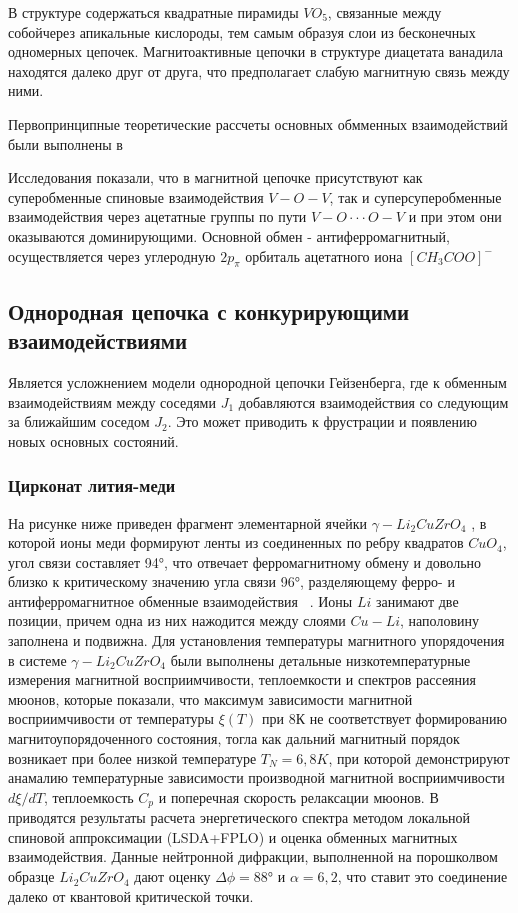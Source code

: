 \documentclass[11pt]{article}
\begin{document}
В структуре содержаться квадратные пирамиды $VO_5$, связанные между собойчерез апикальные кислороды, тем самым образуя слои из бесконечных одномерных цепочек. Магнитоактивные цепочки в структуре диацетата ванадила находятся далеко друг от друга, что предполагает слабую магнитную связь между ними.

Первопринципные теоретические рассчеты основных обмменных взаимодействий были выполнены в ~\cite{koo2010}

Исследования показали, что в магнитной цепочке присутствуют как суперобменные спиновые взаимодействия $V-O-V$, так и суперсуперобменные взаимодействия через ацетатные группы по пути $V-O \cdot \cdot \cdot O-V$ и при этом они оказываются доминирующими.
Основной обмен - антиферромагнитный, осуществляется через углеродную $2p_{\pi}$ орбиталь ацетатного иона $[CH_3COO]^{-}$

\subsection{Однородная цепочка с конкурирующими взаимодействиями}
Является усложнением модели однородной цепочки Гейзенберга, где к обменным взаимодействиям между соседями $J_1$ добавляются взаимодействия со следующим за ближайшим соседом $J_2$. Это может приводить к фрустрации и появлению новых основных состояний.

\subsubsection{Цирконат лития-меди}
На рисунке ниже приведен фрагмент элементарной ячейки $\gamma - Li_2CuZrO_4$ , в которой ионы меди формируют ленты из соединенных по ребру квадратов $CuO_4$, угол связи составляет 94°, что 
отвечает ферромагнитному обмену и довольно близко к критическому значению угла связи 96°, разделяющему ферро- и антиферромагнитное обменные взаимодействия ~\cite{goodenough}.
Ионы $Li$ занимают две позиции, причем одна из них нажодится между слоями $Cu-Li$, наполовину заполнена и подвижна.
Для установления температуры магнитного упорядочения в системе $\gamma - Li_2CuZrO_4$ были выполнены детальные низкотемпературные измерения магнитной восприимчивости, теплоемкости и спектров рассеяния мюонов, которые показали, что максимум зависимости магнитной восприимчивости от температуры $\xi(T)$ при 8К не соответствует формированию магнитоупорядоченного состояния, тогла как дальний магнитный порядок возникает при более низкой температуре $T_N=6,8K$, при которой демонстрируют анамалию температурные зависимости производной магнитной восприимчивости $d\xi/dT$, теплоемкость $C_p$ и поперечная скорость релаксации мюонов.
В ~\cite{jpscp_8_034012} приводятся результаты расчета энергетического спектра методом локальной спиновой аппроксимации (LSDA+FPLO) и оценка обменных магнитных взаимодействия. Данные нейтронной дифракции, выполненной на порошколвом образце $Li_2CuZrO_4$ дают оценку $\Delta \phi = 88°$ и $\alpha=6,2$, что ставит это соединение далеко от квантовой критической точки.
\end{document}

